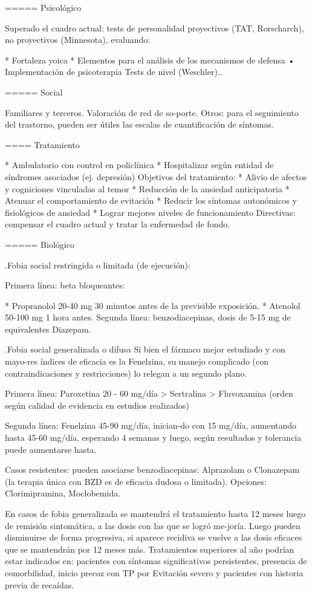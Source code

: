\documentclass{scrbook}
\begin{document}
===== Psicológico

Superado el cuadro actual: tests de personalidad proyectivos (TAT, Rorscharch), no proyectivos (Minnesota), evaluando:

* Fortaleza yoica
* Elementos para el análisis de los mecanismos de defensa • Implementación de psicoterapia Tests de nivel (Weschler)..

===== Social

Familiares y terceros. Valoración de red de so-porte. Otros: para el seguimiento del trastorno, pueden ser útiles las escalas de cuantificación de síntomas.

==== Tratamiento

* Ambulatorio con control en policlínica
* Hospitalizar según entidad de síndromes asociados (ej. depresión) Objetivos del tratamiento:
* Alivio de afectos y cogniciones vinculadas al temor
* Reducción de la ansiedad anticipatoria
* Atenuar el comportamiento de evitación
* Reducir los síntomas autonómicos y fisiológicos de ansiedad
* Lograr mejores niveles de funcionamiento Directivas: compensar el cuadro actual y tratar la enfermedad de fondo.

===== Biológico

.Fobia social restringida o limitada (de ejecución):

Primera línea: beta bloqueantes:

* Propranolol 20-40 mg 30 minutos antes de la previsible exposición.
* Atenolol 50-100 mg 1 hora antes. Segunda línea: benzodiacepinas, dosis de 5-15 mg de equivalentes Diazepam.

.Fobia social generalizada o difusa
Si bien el fármaco mejor estudiado y con mayo-res índices de eficacia es la Fenelzina, su manejo complicado (con contraindicaciones y restricciones) lo relegan a un segundo plano.

Primera línea: Paroxetina 20 - 60 mg/día > Sertralina > Fluvoxamina (orden según calidad de evidencia en estudios realizados)

Segunda línea: Fenelzina 45-90 mg/día, inician-do con 15 mg/día, aumentando hasta 45-60 mg/día, esperando 4 semanas y luego, según resultados y tolerancia puede aumentarse hasta.

Casos resistentes: pueden asociarse benzodiacepinas: Alprazolam o Clonazepam (la terapia única con BZD es de eficacia dudosa o limitada). Opciones: Clorimipramina, Moclobemida.

En casos de fobia generalizada se mantendrá el tratamiento hasta 12 meses luego de remisión sintomática, a las dosis con las que se logró me-joría. Luego pueden disminuirse de forma progresiva, si aparece recidiva se vuelve a las dosis eficaces que se mantendrán por 12 meses más. Tratamientos superiores al año podrían estar indicados en: pacientes con síntomas significativos persistentes, presencia de comorbilidad, inicio precoz con TP por Evitación severo y pacientes con historia previa de recaídas.
\end{document}
